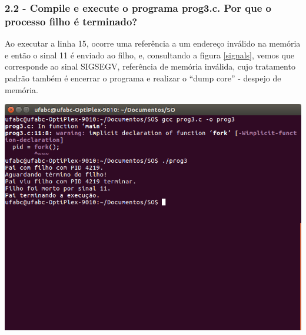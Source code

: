 \subsubsection{2.2 - Compile e execute o programa prog3.c. Por que o processo ﬁlho é terminado?}

\vspace{-0.5em}
\begin{minipage}{\textwidth}
  \hspace{-1em}
  \centering
  
  \label{prog3}
  \hspace{1em}
\end{minipage}
\vspace{0.5em}

Ao executar a linha 15, ocorre uma referência a um endereço inválido na memória e então o sinal 11 é enviado ao filho, e, consultando a figura \ref{signals}, vemos que corresponde ao sinal SIGSEGV, referência de memória inválida, cujo tratamento padrão também é encerrar o programa e realizar o ``dump core'' - despejo de memória.

\vspace{2em}
\begin{minipage}{\textwidth}
    \hspace{-1em}
    \centering
    \includegraphics[trim=0 300 0 0,clip,scale=.4]{pratica1/prog3.png}
    \label{prog3png}
    \hspace{1em}
\end{minipage}
\vspace{0.5em}


